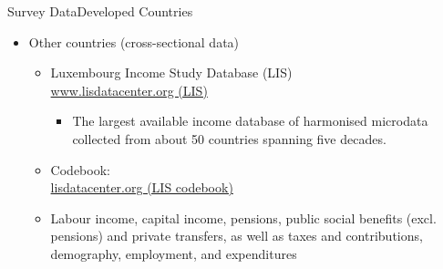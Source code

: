 \documentclass[hyperref={pdfpagelabels=false}]{beamer}
\begin{document}
\begin{frame}{Survey Data}{Developed Countries}
	\begin{itemize} 
		\item Other countries (cross-sectional data)
		\begin{itemize} 
			\vspace{0.3cm}
			\item Luxembourg Income Study Database (LIS)  \\ \href{https://www.lisdatacenter.org/our-data/lis-database/}{www.lisdatacenter.org (LIS)}
			\begin{itemize}
				\item The largest available income database of harmonised microdata collected from about 50 countries spanning five decades.
			\end{itemize}
					\vspace{0.3cm}
		\item Codebook:  \\
		
		\href{https://www.lisdatacenter.org/wp-content/uploads/files/data-lis-variables.pdf}{lisdatacenter.org (LIS codebook)}
		
							\vspace{0.3cm}
		\item Labour income, capital income, pensions, public social benefits (excl. pensions) and private transfers, as well as taxes and contributions, demography, employment, and expenditures
		
		\end{itemize}
		
	\end{itemize}
\end{frame}
\end{document}
